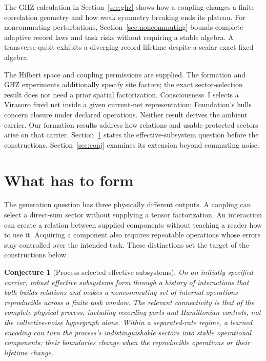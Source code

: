 \documentclass[12pt,a4paper]{article}
\newtheorem{conjecture}[theorem]{Conjecture}
\begin{document}
The GHZ calculation in Section~\ref{sec:ghz} shows how a coupling changes a finite correlation geometry and how weak symmetry breaking ends its plateau. For noncommuting perturbations, Section~\ref{sec:noncommuting} bounds complete adaptive record laws and task risks without requiring a stable algebra. A transverse qubit exhibits a diverging record lifetime despite a scalar exact fixed algebra.

The Hilbert space and coupling permissions are supplied. The formation and GHZ experiments additionally specify site factors; the exact sector-selection result does not need a prior spatial factorization. Consciousness~I \cite{PaperCI} selects a Virasoro fixed net inside a given current-net representation; Foundation's hulls concern closure under declared operations. Neither result derives the ambient carrier. Our formation results address how relations and usable protected sectors arise on that carrier. Section~\ref{sec:formation-question} states the effective-subsystem question before the constructions. Section~\ref{sec:conj} examines its extension beyond commuting noise.

\section{What has to form}
\label{sec:formation-question}

The generation question has three physically different outputs.
A coupling can select a direct-sum sector without supplying a tensor
factorization. An interaction can create a relation between supplied
components without teaching a reader how to use it. Acquiring a component
also requires repeatable operations whose errors stay controlled over
the intended task. These distinctions set the target of the constructions
below.

\begin{conjecture}[Process-selected effective subsystems]
\label{conj:mereology}
On an initially specified carrier, robust effective subsystems form
through a history of interactions that both builds relations and
makes a noncommuting set of internal operations reproducible across
a finite task window. The relevant connectivity is that of the
complete physical process, including recording ports and
Hamiltonian controls, not the collective-noise hypergraph alone.
Within a separated-rate regime, a learned encoding can turn the
process's indistinguishable sectors into stable operational
components; their boundaries change when the reproducible
operations or their lifetime change.
\end{conjecture}
\end{document}
